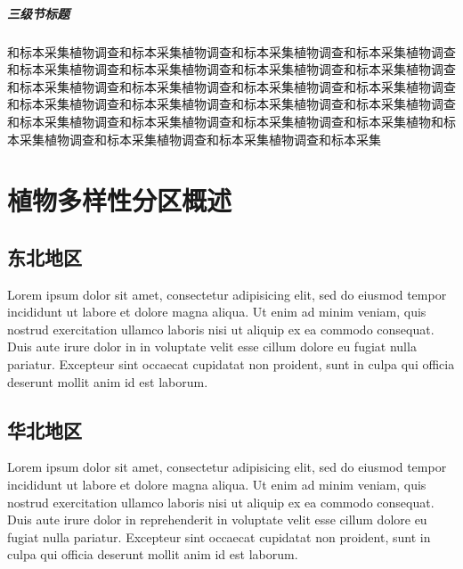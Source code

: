 \documentclass[utf8]{book}
\begin{document}
	\subsubsection{三级节标题}
	
	\begin{multicols}{2}
		和标本采集植物调查和标本采集植物调查和标本采集植物调查和标本采集植物调查和标本采集植物调查和标本采集植物调查和标本采集植物调查和标本采集植物调查和标本采集植物调查和标本采集植物调查和标本采集植物调查和标本采集植物调查和标本采集植物调查和标本采集植物调查和标本采集植物调查和标本采集植物调查和标本采集植物调查和标本采集植物调查和标本采集植物调查和标本采集植物和标本采集植物调查和标本采集植物调查和标本采集植物调查和标本采集
		
	\end{multicols}
	
	\part{植物多样性分区概述}
	
	\chapter{东北地区}
	
	\begin{multicols}{2}
		Lorem ipsum dolor sit amet, consectetur adipisicing elit, sed do eiusmod tempor incididunt ut labore et dolore magna aliqua. Ut enim ad minim veniam, quis nostrud exercitation ullamco laboris nisi ut aliquip ex ea commodo consequat. Duis aute irure dolor in  in voluptate velit esse cillum dolore eu fugiat nulla pariatur. Excepteur sint occaecat cupidatat non proident, sunt in culpa qui officia deserunt mollit anim id est laborum.
	\end{multicols}
	
	\chapter{华北地区}
	\begin{multicols}{2}
		Lorem ipsum dolor sit amet, consectetur adipisicing elit, sed do eiusmod tempor incididunt ut labore et dolore magna aliqua. Ut enim ad minim veniam, quis nostrud exercitation ullamco laboris nisi ut aliquip ex ea commodo consequat. Duis aute irure dolor in reprehenderit in voluptate velit esse cillum dolore eu fugiat nulla pariatur. Excepteur sint occaecat cupidatat non proident, sunt in culpa qui officia deserunt mollit anim id est laborum.
	\end{multicols}
	
\end{document}
